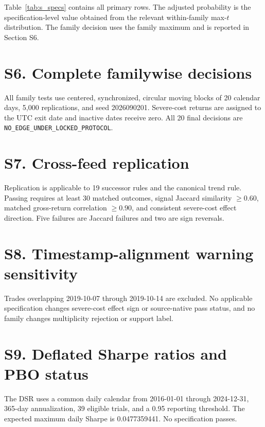 \documentclass[a4paper,fleqn]{cas-sc}
\begin{document}
Table~\ref{tab:s_specs} contains all primary rows. The adjusted probability is the specification-level value obtained from the relevant within-family max-$t$ distribution. The family decision uses the family maximum and is reported in Section S6.



\section*{S6. Complete familywise decisions}

All family tests use centered, synchronized, circular moving blocks of 20 calendar days, 5,000 replications, and seed 2026090201. Severe-cost returns are assigned to the UTC exit date and inactive dates receive zero. All 20 final decisions are \texttt{NO\_EDGE\_UNDER\_LOCKED\_PROTOCOL}.



\section*{S7. Cross-feed replication}

Replication is applicable to 19 successor rules and the canonical trend rule. Passing requires at least 30 matched outcomes, signal Jaccard similarity $\ge0.60$, matched gross-return correlation $\ge0.90$, and consistent severe-cost effect direction. Five failures are Jaccard failures and two are sign reversals.



\section*{S8. Timestamp-alignment warning sensitivity}

Trades overlapping 2019-10-07 through 2019-10-14 are excluded. No applicable specification changes severe-cost effect sign or source-native pass status, and no family changes multiplicity rejection or support label.



\section*{S9. Deflated Sharpe ratios and PBO status}

The DSR uses a common daily calendar from 2016-01-01 through 2024-12-31, 365-day annualization, 39 eligible trials, and a 0.95 reporting threshold. The expected maximum daily Sharpe is 0.0477359441. No specification passes.
\end{document}
